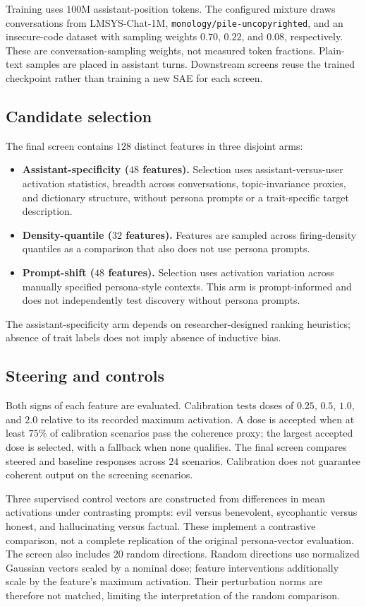 \documentclass[11pt]{article}
\begin{document}
Training uses $100$M assistant-position tokens. The configured mixture draws
conversations from LMSYS-Chat-1M, \texttt{monology/pile-uncopyrighted}, and an
insecure-code dataset with sampling weights $0.70$, $0.22$, and $0.08$,
respectively. These are conversation-sampling weights, not measured token
fractions. Plain-text samples are placed in assistant turns. Downstream screens
reuse the trained checkpoint rather than training a new SAE for each screen.

\subsection{Candidate selection}
The final screen contains $128$ distinct features in three disjoint arms:
\begin{itemize}
\item \textbf{Assistant-specificity ($48$ features).} Selection uses
assistant-versus-user activation statistics, breadth across conversations,
topic-invariance proxies, and dictionary structure, without persona prompts or
a trait-specific target description.
\item \textbf{Density-quantile ($32$ features).} Features are sampled across
firing-density quantiles as a comparison that also does not use persona prompts.
\item \textbf{Prompt-shift ($48$ features).} Selection uses activation variation
across manually specified persona-style contexts. This arm is prompt-informed
and does not independently test discovery without persona prompts.
\end{itemize}
The assistant-specificity arm depends on researcher-designed ranking heuristics;
absence of trait labels does not imply absence of inductive bias.

\subsection{Steering and controls}
Both signs of each feature are evaluated. Calibration tests doses of $0.25$,
$0.5$, $1.0$, and $2.0$ relative to its recorded maximum activation. A dose is
accepted when at least $75\%$ of calibration scenarios pass the coherence proxy;
the largest accepted dose is selected, with a fallback when none qualifies.
The final screen compares steered and baseline responses across $24$ scenarios.
Calibration does not guarantee coherent output on the screening scenarios.

Three supervised control vectors are constructed from differences in mean
activations under contrasting prompts: evil versus benevolent, sycophantic versus
honest, and hallucinating versus factual. These implement a contrastive
comparison, not a complete replication of the original persona-vector evaluation.
The screen also includes $20$ random directions. Random directions use normalized
Gaussian vectors scaled by a nominal dose; feature interventions additionally
scale by the feature's maximum activation. Their perturbation norms are therefore
not matched, limiting the interpretation of the random comparison.
\end{document}
